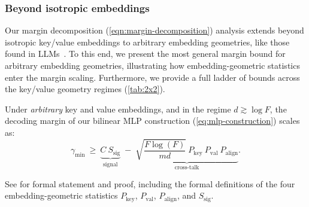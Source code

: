 \subsubsection{Beyond isotropic embeddings}

\label{sec:arbk-isov}
\label{sec:isok-arbv}
\label{sec:arbk-arbv}
Our margin decomposition (\cref{eqn:margin-decomposition}) analysis extends beyond isotropic key/value embeddings to arbitrary embedding geometries, like those found in LLMs~\citep{ethayarajh2019contextualcontextualizedwordrepresentations,razzhigaev2024shapelearninganisotropyintrinsic}. To this end, we present the most general margin bound for arbitrary embedding geometries, illustrating how embedding-geometric statistics enter the margin scaling. Furthermore, we provide a full ladder of bounds across the key/value geometry regimes (\cref{tab:2x2}).




\begin{theorem}\label{thm:bilinear-scaling}
Under \emph{arbitrary} key and value embeddings, and in the regime $d\gtrsim\log F$, the decoding margin of our bilinear MLP construction (\cref{eq:mlp-construction}) scales as:
\begin{equation}
\gamma_{\min}
\ \geq\
\underbrace{C \ S_{\mathrm{sig}}}_{\text{signal}}
\;-\;
\underbrace{\sqrt{\frac{F\log(F)}{md}} \ P_{\mathrm{key}}
\ P_{\mathrm{val}}
\ P_{\mathrm{align}} }_{\text{cross-talk}}.
\label{eq:maintext:akav_margin_bound}
\end{equation}
\end{theorem}
See  for formal statement and proof, including the formal definitions of the four embedding-geometric statistics $P_{\mathrm{key}}$, $P_{\mathrm{val}}$, $P_{\mathrm{align}}$, and $S_{\mathrm{sig}}$.

\newcommand{\keyact}{\boldsymbol{K}}
\newcommand{\valint}{\boldsymbol{V}}

